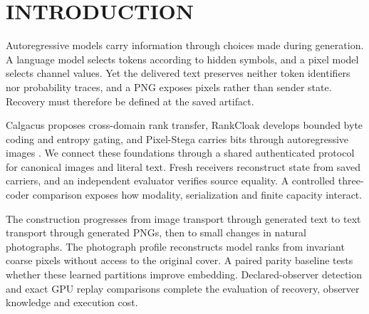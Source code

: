 \section{\uppercase{Introduction}}
\label{sec:introduction}
Autoregressive models carry information through choices made during generation. A language model selects tokens according to hidden symbols, and a pixel model selects channel values. Yet the delivered text preserves neither token identifiers nor probability traces, and a PNG exposes pixels rather than sender state. Recovery must therefore be defined at the saved artifact.\aifootnote

Calgacus proposes cross-domain rank transfer, RankCloak develops bounded byte coding and entropy gating, and Pixel-Stega carries bits through autoregressive images \cite{calgacus,rankcloak,pixelstega}. We connect these foundations through a shared authenticated protocol for canonical images and literal text. Fresh receivers reconstruct state from saved carriers, and an independent evaluator verifies source equality. A controlled three-coder comparison exposes how modality, serialization and finite capacity interact.

The construction progresses from image transport through generated text to text transport through generated PNGs, then to small changes in natural photographs. The photograph profile reconstructs model ranks from invariant coarse pixels without access to the original cover. A paired parity baseline tests whether these learned partitions improve embedding. Declared-observer detection and exact GPU replay comparisons complete the evaluation of recovery, observer knowledge and execution cost.
